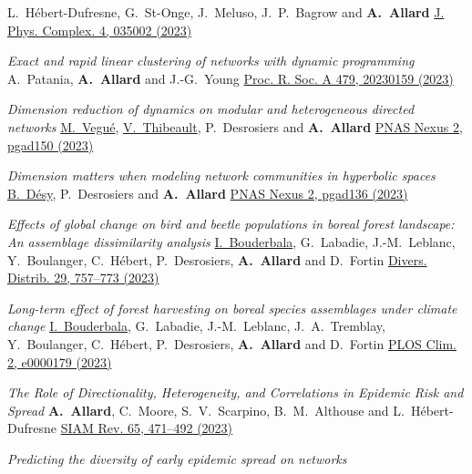 \documentclass[11pt]{article}
\makeatletter
\newcommand{\reversearabic}[1]{\expandafter\@reversearabic\csname c@#1\endcsname}
\newcommand{\@reversearabic}[1]{%
  \number\numexpr\getrefnumber{this@etaremune@\romannumeral\c@etaremune}-#1+1\relax
}
\newcounter{etaremune}
\newenvironment{etaremune}[1][]{%
  \stepcounter{etaremune}%
  \begin{enumerate}[label=\reversearabic*.,#1]%
}{%
  \edef\@currentlabel{\the\csname c@\@enumctr\endcsname}%
  \label{this@etaremune@\romannumeral\c@etaremune}%
  \end{enumerate}%
}
\makeatother
\begin{document}
\begin{etaremune}[itemsep=0.5em, label={[A\reversearabic*]}]
{  L.~Hébert-Dufresne, G.~St-Onge, J.~Meluso, J.~P.~Bagrow and \textbf{A.~Allard}\split
  \href{https://doi.org/10.1088/2632-072X/ace602}{J. Phys. Complex. 4, 035002 (2023)}}
%
  \item \parbox[t]{\textwidth-30pt}{\textit{Exact and rapid linear clustering of networks with dynamic programming}\split
  A.~Patania, \textbf{A.~Allard} and J.-G.~Young\split
  \href{https://doi.org/10.1098/rspa.2023.0159}{Proc. R. Soc. A 479, 20230159 (2023)}}
%
  \item \parbox[t]{\textwidth-30pt}{\textit{Dimension reduction of dynamics on modular and heterogeneous directed networks}\split
  \uline{M.~Vegué}, \uline{V.~Thibeault}, P.~Desrosiers and \textbf{A.~Allard}\split
  \href{https://doi.org/10.1093/pnasnexus/pgad150}{PNAS Nexus 2, pgad150 (2023)}}
%
  \item \parbox[t]{\textwidth-30pt}{\textit{Dimension matters when modeling network communities in hyperbolic spaces}\split
  \uline{B.~Désy}, P.~Desrosiers and \textbf{A.~Allard}\split
  \href{https://doi.org/10.1093/pnasnexus/pgad136}{PNAS Nexus 2, pgad136 (2023)}}
%
  \item \parbox[t]{\textwidth-30pt}{\textit{Effects of global change on bird and beetle populations in boreal forest landscape: An assemblage dissimilarity analysis}\split
  \uline{I.~Bouderbala}, G.~Labadie, J.-M.~Leblanc, Y.~Boulanger, C.~Hébert, P.~Desrosiers, \textbf{A.~Allard} and D.~Fortin\split
  \href{https://doi.org/10.1111/ddi.13697}{Divers. Distrib. 29, 757--773 (2023)}}
%
  \item \parbox[t]{\textwidth-30pt}{\textit{Long-term effect of forest harvesting on boreal species assemblages under climate change}\split
  \uline{I.~Bouderbala}, G.~Labadie, J.-M.~Leblanc, J.~A.~Tremblay, Y.~Boulanger, C.~Hébert, P.~Desrosiers, \textbf{A.~Allard} and D.~Fortin\split
  \href{https://doi.org/10.1371/journal.pclm.0000179}{PLOS Clim. 2, e0000179 (2023)}}
%
  \item \parbox[t]{\textwidth-30pt}{\textit{The Role of Directionality, Heterogeneity, and Correlations in Epidemic Risk and Spread}\split
  \textbf{A.~Allard}, C.~Moore, S.~V.~Scarpino, B.~M.~Althouse and L.~H\'ebert-Dufresne\split
  \href{https://doi.org/10.1137/20m1383811}{SIAM Rev. 65, 471--492 (2023)}}
%
  \item \parbox[t]{\textwidth-30pt}{\textit{Predicting the diversity of early epidemic spread on networks}\split
}
\end{etaremune}
\end{document}
